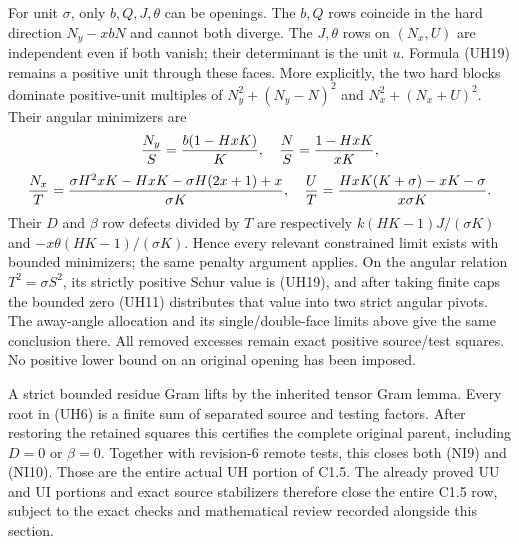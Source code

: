 For unit $\sigma$, only $b,Q,J,\theta$ can be openings.
The $b,Q$ rows coincide in the hard direction $N_y-xbN$ and cannot
both diverge. The $J,\theta$ rows on $(N_x,U)$ are independent even
if both vanish; their determinant is the unit $u$. Formula (UH19)
remains a positive unit through these faces. More explicitly, the
two hard blocks dominate positive-unit multiples of
$N_y^2+(N_y-N)^2$ and $N_x^2+(N_x+U)^2$. Their angular minimizers are
\[
 {N_y\over S}={b(1-HxK)\over K},\quad
 {N\over S}={1-HxK\over xK},
\]
\[
 {N_x\over T}={\sigma H^2xK-HxK-\sigma H(2x+1)+x\over\sigma K},
 \quad {U\over T}={HxK(K+\sigma)-xK-\sigma\over x\sigma K}.
\]
Their $D$ and $\beta$ row defects divided by $T$ are respectively
$k(HK-1)J/(\sigma K)$ and $-x\theta(HK-1)/(\sigma K)$.
Hence every relevant constrained limit exists with bounded
minimizers; the same penalty argument applies. On the angular
relation $T^2=\sigma S^2$, its strictly positive Schur value is
(UH19), and after taking finite caps the bounded zero (UH11)
distributes that value into two strict angular pivots. The away-angle
allocation and its single/double-face limits above give the same
conclusion there. All removed excesses remain exact positive
source/test squares. No positive lower bound on an original opening
has been imposed.

A strict bounded residue Gram lifts by the inherited tensor Gram
lemma. Every root in (UH6) is a finite sum of separated source and
testing factors. After restoring the retained squares this certifies
the complete original parent, including $D=0$ or $\beta=0$.
Together with revision-6 remote tests, this closes both (NI9) and
(NI10). Those are the entire actual UH portion of C1.5. The already
proved UU and UI portions and exact source stabilizers therefore close
the entire C1.5 row, subject to the exact checks and mathematical review
recorded alongside this section.
